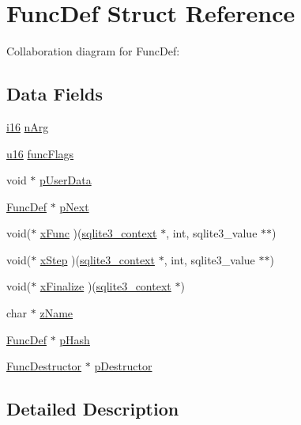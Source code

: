\hypertarget{struct_func_def}{}\section{Func\+Def Struct Reference}
\label{struct_func_def}


Collaboration diagram for Func\+Def\+:
\subsection*{Data Fields}
\begin{DoxyCompactItemize}
\item 
\hyperlink{sqlite3_8c_a7b32340f65cd15f029caad258fb3355c}{i16} \hyperlink{struct_func_def_a40bc3848b668eb072f0a52f662d78d9a}{n\+Arg}
\item 
\hyperlink{sqlite3_8c_a20f2299e322dcbde37cb07b16910b843}{u16} \hyperlink{struct_func_def_a046acf0266e49bab3fee2be79eee4993}{func\+Flags}
\item 
void $\ast$ \hyperlink{struct_func_def_a8d75dbe9027a94780bc2f31670400613}{p\+User\+Data}
\item 
\hyperlink{struct_func_def}{Func\+Def} $\ast$ \hyperlink{struct_func_def_ad76d035fd062a7a1568a052ede09ea6e}{p\+Next}
\item 
void($\ast$ \hyperlink{struct_func_def_a0ab77577dd4a4a51c4182b9ca4c72c36}{x\+Func} )(\hyperlink{structsqlite3__context}{sqlite3\+\_\+context} $\ast$, int, sqlite3\+\_\+value $\ast$$\ast$)
\item 
void($\ast$ \hyperlink{struct_func_def_a47b7ab6a7f27a9fa11ecf8105df6b32c}{x\+Step} )(\hyperlink{structsqlite3__context}{sqlite3\+\_\+context} $\ast$, int, sqlite3\+\_\+value $\ast$$\ast$)
\item 
void($\ast$ \hyperlink{struct_func_def_a41e296d3e0af2a6f7c80c94139988e77}{x\+Finalize} )(\hyperlink{structsqlite3__context}{sqlite3\+\_\+context} $\ast$)
\item 
char $\ast$ \hyperlink{struct_func_def_a661118d86ac4127d40bf3be78d92117d}{z\+Name}
\item 
\hyperlink{struct_func_def}{Func\+Def} $\ast$ \hyperlink{struct_func_def_aa8c6f56dcfbdae15ece45ba7b71a13bb}{p\+Hash}
\item 
\hyperlink{struct_func_destructor}{Func\+Destructor} $\ast$ \hyperlink{struct_func_def_ad1dfb003b093e5f8b868da1d6676c484}{p\+Destructor}
\end{DoxyCompactItemize}


\subsection{Detailed Description}


